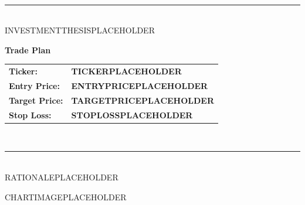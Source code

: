 \documentclass[11pt,a4paper]{article}
\begin{document}
\vspace{1em}

\setlength{\parskip}{0.3em}
\setlength{\parindent}{0pt}

\\[0.3em]
\noindent\rule{\textwidth}{0.5pt}\\[0.5em]
{\normalsize
INVESTMENTTHESISPLACEHOLDER
}

\vspace{1em}

\begin{center}
    \begin{tcolorbox}[
        colback=lightblue,
        colframe=mpcblue,
        boxrule=2pt,
        arc=3pt,
        width=0.8\textwidth,
        left=1em,
        right=1em,
        top=1em,
        bottom=1em
    ]
        \centering
        {\Large\bfseries\color{mpcblue} Trade Plan}
        
        \vspace{1em}
        
        \begin{tabular}{ll}
            \textbf{Ticker:} & \textbf{TICKERPLACEHOLDER} \\
            \textbf{Entry Price:} & \textbf{ENTRYPRICEPLACEHOLDER} \\
            \textbf{Target Price:} & \textbf{TARGETPRICEPLACEHOLDER} \\
            \textbf{Stop Loss:} & \textbf{STOPLOSSPLACEHOLDER}
        \end{tabular}
    \end{tcolorbox}
\end{center}

\vspace{1em}

\\[0.3em]
\noindent\rule{\textwidth}{0.5pt}\\[0.5em]
{\normalsize
RATIONALEPLACEHOLDER
}

CHARTIMAGEPLACEHOLDER
\end{document}
